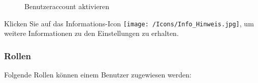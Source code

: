 \begin{figure}[H]
\caption{Benutzeraccount aktivieren}
\end{figure}

Klicken Sie auf das Informations-Icon \texttt{[image: /Icons/Info\_Hinweis.jpg]}, um weitere Informationen zu den Einstellungen zu erhalten.

\vspace{-10pt}

\subsubsection{Rollen}
\label{bkm:Ref445361985}

Folgende Rollen können einem Benutzer zugewiesen werden:


